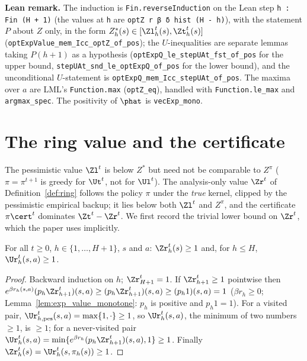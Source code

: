 \textbf{Lean remark.} The induction is \texttt{Fin.reverseInduction} on the Lean step
\texttt{h : Fin (H + 1)} (the values at \texttt{h} are \texttt{optZ r β δ hist (H - h)}), with the statement $P$
about $Z$ only, in the form $Z^*_h(s) \in [\Zl^t_h(s), \Zt^t_h(s)]$
(\texttt{optExpValue\_mem\_Icc\_optZ\_of\_pos}); the $U$-inequalities are separate lemmas taking
$P(h+1)$ as a hypothesis (\texttt{optExpQ\_le\_stepUAt\_fst\_of\_pos} for the upper bound,
\texttt{stepUAt\_snd\_le\_optExpQ\_of\_pos} for the lower bound), and the unconditional $U$-statement
is \texttt{optExpQ\_mem\_Icc\_stepUAt\_of\_pos}. The maxima over $a$ are LML's \texttt{Function.max}
(\texttt{optZ\_eq}), handled with \texttt{Function.le\_max} and \texttt{argmax\_spec}. The positivity of
$\phat$ is \texttt{vecExp\_mono}.

\section{The ring value and the certificate}
\label{sec:pos_certificate}

The pessimistic value $\Zl^t$ is below $Z^*$ but need not be comparable to $Z^{\pi}$
($\pi = \pi^{t+1}$ is greedy for $\Ut^t$, not for $\Ul^t$). The analysis-only value $\Zr^t$ of
Definition~\ref{def:ring} follows the policy $\pi$ under the \emph{true} kernel, clipped by the
pessimistic empirical backup; it lies below both $\Zl^t$ and $Z^\pi$, and the certificate
$\pi\cert^t$ dominates $\Zt^t - \Zr^t$. We first record the trivial lower bound on $\Zr^t$,
which the paper uses implicitly.

\begin{lemma}\label{lem:pos_ring_range}
\leanok
{}
For all $t \ge 0$, $h \in \{1, \dots, H + 1\}$, $s$ and $a$: $\Zr_h^t(s) \ge 1$ and, for $h \le H$,
$\Ur_h^t(s,a) \ge 1$.
\end{lemma}

\begin{proof}
\leanok
Backward induction on $h$; $\Zr_{H+1}^t = 1$. If $\Zr_{h+1}^t \ge 1$ pointwise then
$e^{\beta r_h(s,a)}(p_h\Zr^t_{h+1})(s,a) \ge (p_h \Zr^t_{h+1})(s,a) \ge (p_h 1)(s,a) = 1$ ($\beta r_h \ge 0$;
Lemma~\ref{lem:exp_value_monotone}: $p_h$ is positive and $p_h 1 = 1$). For a visited pair,
$\Ur^t_{h,\mathrm{pes}}(s,a) = \max\{1, \cdot\} \ge 1$, so $\Ur_h^t(s,a)$, the minimum of two numbers
$\ge 1$, is $\ge 1$; for a never-visited pair $\Ur_h^t(s,a) = \min\{e^{\beta r_h}(p_h\Zr^t_{h+1})(s,a), 1\} \ge 1$.
Finally $\Zr_h^t(s) = \Ur_h^t(s, \pi_h(s)) \ge 1$.
\end{proof}


